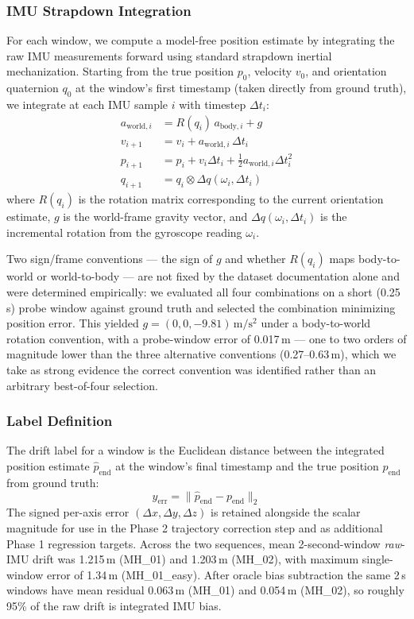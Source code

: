 \subsubsection{IMU Strapdown Integration}
For each window, we compute a model-free position estimate by
integrating the raw IMU measurements forward using standard strapdown
inertial mechanization. Starting from the true position $p_0$, velocity
$v_0$, and orientation quaternion $q_0$ at the window's first timestamp
(taken directly from ground truth), we integrate at each IMU sample
$i$ with timestep $\Delta t_i$:
\begin{align}
  a_{\text{world},i} &= R(q_i)\, a_{\text{body},i} + g \\
  v_{i+1} &= v_i + a_{\text{world},i}\, \Delta t_i \\
  p_{i+1} &= p_i + v_i \Delta t_i + \tfrac{1}{2} a_{\text{world},i} \Delta t_i^2 \\
  q_{i+1} &= q_i \otimes \Delta q(\omega_i, \Delta t_i)
\end{align}
where $R(q_i)$ is the rotation matrix corresponding to the current
orientation estimate, $g$ is the world-frame gravity vector, and
$\Delta q(\omega_i, \Delta t_i)$ is the incremental rotation from the
gyroscope reading $\omega_i$.

Two sign/frame conventions — the sign of $g$ and whether $R(q_i)$ maps
body-to-world or world-to-body — are not fixed by the dataset
documentation alone and were determined empirically: we evaluated all
four combinations on a short (0.25\,s) probe window against ground
truth and selected the combination minimizing position error. This
yielded $g = (0,0,-9.81)\,\mathrm{m/s^2}$ under a body-to-world rotation
convention, with a probe-window error of 0.017\,m — one to two orders of
magnitude lower than the three alternative conventions (0.27–0.63\,m),
which we take as strong evidence the correct convention was identified
rather than an arbitrary best-of-four selection.

\subsubsection{Label Definition}
The drift label for a window is the Euclidean distance between the
integrated position estimate $\hat{p}_{\text{end}}$ at the window's final
timestamp and the true position $p_{\text{end}}$ from ground truth:
\begin{equation}
  y_{\text{err}} = \lVert \hat{p}_{\text{end}} - p_{\text{end}} \rVert_2
\end{equation}
The signed per-axis error $(\Delta x, \Delta y, \Delta z)$ is retained
alongside the scalar magnitude for use in the Phase 2 trajectory
correction step and as additional Phase 1 regression targets. Across the
two sequences, mean 2-second-window \emph{raw}-IMU drift was 1.215\,m
(MH\_01) and 1.203\,m (MH\_02), with maximum single-window error of
1.34\,m (MH\_01\_easy). After oracle bias subtraction the same 2\,s
windows have mean residual 0.063\,m (MH\_01) and 0.054\,m (MH\_02), so
roughly 95\% of the raw drift is integrated IMU bias.

